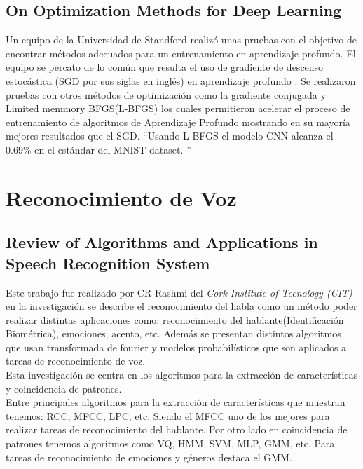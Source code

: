\subsection{On Optimization Methods for Deep Learning}
Un equipo de la Universidad de Standford realizó unas pruebas con el objetivo de encontrar métodos adecuados para un entrenamiento en aprendizaje profundo. El equipo se percato de lo común que resulta el uso de gradiente de descenso estocástica (SGD por sus siglas en inglés) en aprendizaje profundo . Se realizaron pruebas con otros métodos de optimización como la gradiente conjugada y Limited memmory BFGS(L-BFGS) los cuales permitieron acelerar el proceso de entrenamiento de algoritmos de Aprendizaje Profundo mostrando en su mayoría mejores resultados que el SGD. \textquotedblleft Usando L-BFGS el modelo CNN alcanza el 0.69\%  en el estándar del MNIST dataset. \textquotedblright \cite{Optimization}


\section{Reconocimiento de Voz}
\subsection{Review of Algorithms and Applications in Speech Recognition System}
Este trabajo fue realizado por CR Rashmi del \textit{ Cork Institute of Tecnology (CIT) } en la investigación se describe el reconocimiento del habla como un método poder realizar distintas aplicaciones como: reconocimiento del hablante(Identificación Biométrica), emociones, acento, etc. Además se presentan distintos algoritmos que usan transformada de fourier y modelos probabilísticos que son aplicados a tareas de reconocimiento de voz.\\ Esta investigación se centra en los algoritmos para la extracción de características y coincidencia de patrones.\\ Entre principales algoritmos para la extracción de características que muestran tenemos: RCC, MFCC, LPC, etc. Siendo el MFCC uno de los mejores para realizar tareas de reconocimiento del hablante. Por otro lado en coincidencia de patrones tenemos algoritmos como VQ, HMM, SVM, MLP, GMM, etc. Para tareas de reconocimiento de emociones y géneros destaca el GMM.
